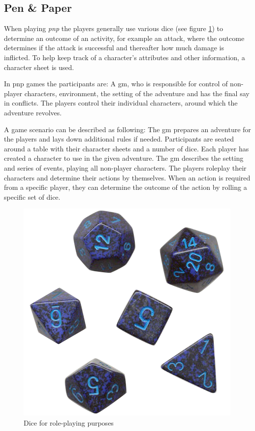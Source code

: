 \subsection{Pen \& Paper}
When playing \emph{\ac{pnp}} the players generally use various dice (see figure \ref{dice}) to determine an outcome of an activity, for example an attack, where the outcome determines if the attack is successful and thereafter how much damage is inflicted. To help keep track of a character's attributes and other information, a character sheet is used.

In \ac{pnp} games the participants are: A \ac{gm}, who is responsible for control of non-player characters, environment, the setting of the adventure and has the final say in conflicts. The players control their individual characters, around which the adventure revolves.

A game scenario can be described as following: The \ac{gm} prepares an adventure for the players and lays down additional rules if needed. Participants are seated around a table with their character sheets and a number of dice. Each player has created a character to use in the given adventure. The \ac{gm} describes the setting and series of events, playing all non-player characters. The players roleplay their characters and determine their actions by themselves. When an action is required from a specific player, they can determine the outcome of the action by rolling a specific set of dice.
\begin{figure}[!h]
\centering
\includegraphics[scale=0.35]{img/rpgdice.png}
\caption{Dice for role-playing purposes}
\label{dice}
\end{figure}

